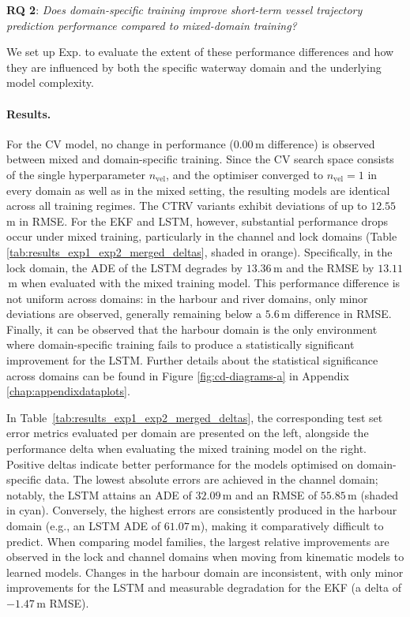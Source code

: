 \FloatBarrier
\textbf{RQ 2}: \textit{Does domain-specific training improve short-term vessel trajectory prediction performance compared to mixed-domain training?}

We set up Exp.  to evaluate the extent of these performance differences and how they are influenced by both the specific waterway domain and the underlying model complexity. %
\paragraph{Results.}

For the \ac{CV} model, no change in performance ($0.00$\,m difference) is observed between mixed and domain-specific training. Since the \ac{CV} search space consists of the single hyperparameter $n_\text{vel}$, and the optimiser converged to $n_\text{vel}=1$ in every domain as well as in the mixed setting, the resulting models are identical across all training regimes. The \ac{CTRV} variants exhibit deviations of up to $12.55$\,m in \ac{RMSE}. 
For the \ac{EKF} and \ac{LSTM}, however, substantial performance drops occur under mixed training, particularly in the channel and lock domains (Table \ref{tab:results_exp1_exp2_merged_deltas}, shaded in orange).
 Specifically, in the lock domain, the \ac{ADE} of the \ac{LSTM} degrades by $13.36$\,m and the \ac{RMSE} by $13.11$\,m when evaluated with the mixed training model.
This performance difference is not uniform across domains: in the harbour and river domains, only minor deviations are observed, generally remaining below a $5.6$\,m difference in \ac{RMSE}.
Finally, it can be observed that the harbour domain is the only environment where domain-specific training fails to produce a statistically significant improvement for the \ac{LSTM}. Further details about the statistical significance across domains can be found in Figure \ref{fig:cd-diagrams-a} in Appendix \ref{chap:appendixdataplots}.


In Table~\ref{tab:results_exp1_exp2_merged_deltas}, the corresponding test set error metrics evaluated per domain are presented on the left, alongside the performance delta when evaluating the mixed training model on the right. Positive deltas indicate better performance for the models optimised on domain-specific data.
The lowest absolute errors are achieved in the channel domain; notably, the \ac{LSTM} attains an \ac{ADE} of $32.09$\,m and an \ac{RMSE} of $55.85$\,m (shaded in cyan).
Conversely, the highest errors are consistently produced in the harbour domain (e.g., an \ac{LSTM} \ac{ADE} of $61.07$\,m), making it comparatively difficult to predict.
When comparing model families, the largest relative improvements are observed in the lock and channel domains when moving from kinematic models to learned models. Changes in the harbour domain are inconsistent, with only minor improvements for the \ac{LSTM} and measurable degradation for the \ac{EKF} (a delta of $-1.47$\,m \ac{RMSE}).

